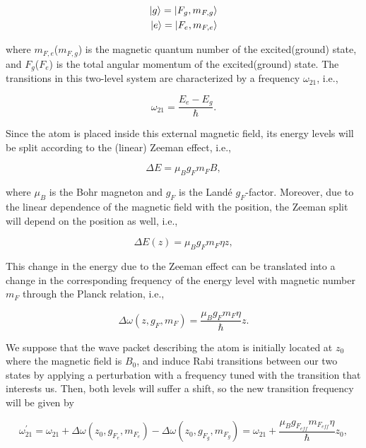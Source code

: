 \documentclass{article}
\begin{document}
\begin{equation}\label{hyperfine_levels}
\begin{aligned}
\ket{g} = \ket{F_{g}, m_{F, g}} \\
\ket{e} = \ket{F_{e}, m_{F, e}}
\end{aligned}
\end{equation}

where $m_{F, e}$($m_{F, g}$) is the magnetic quantum number of the excited(ground) state, and $F_{g}$($F_{e}$) is the total angular momentum of the excited(ground) state.
The transitions in this two-level system are characterized by a frequency  $\omega_{21}$, i.e.,

\begin{equation}
  \omega_{21} = \frac{E_{e}-E_{g}}{\hbar}.
\end{equation}

Since the atom is placed inside this external magnetic field, its energy levels will be split according to the (linear) Zeeman effect, i.e.,

\begin{equation}
  \Delta E = \mu_{B} g_{F} m_{F} B,
\end{equation}

where $\mu_{B}$ is the Bohr magneton and $g_{F}$ is the Landé $g_{F}$-factor. Moreover, due to the linear dependence of the magnetic field with the position, the Zeeman split will depend on the position as well, i.e.,

\begin{equation}
  \Delta E(z) = \mu_{B} g_{F} m_{F} \eta z,
\end{equation}

This change in the energy due to the Zeeman effect can be translated into a change in the corresponding frequency of the energy level with magnetic number $m_{F}$ through the Planck relation, i.e.,

\begin{equation}
  \Delta \omega(z, g_{F}, m_{F}) = \frac{\mu_{B} g_{F} m_{F} \eta}{\hbar} z.
\end{equation}

We suppose that the wave packet describing the atom is initially located at $z_{0}$ where the magnetic field is $B_{0}$, and induce Rabi transitions between our two states by applying a perturbation with a frequency tuned with the transition that interests us. Then, both levels will suffer a shift, so the new transition frequency will be given by 

\begin{equation}
  \omega_{21}^{\prime} = \omega_{21} + \Delta \omega(z_{0}, g_{F_{e}}, m_{F_{e}}) -  \Delta \omega(z_{0}, g_{F_{g}}, m_{F_{g}}) =  \omega_{21} + \frac{\mu_{B} g_{F_{eff}} m_{F_{eff}} \eta}{\hbar} z_{0},
\end{equation}
\end{document}
